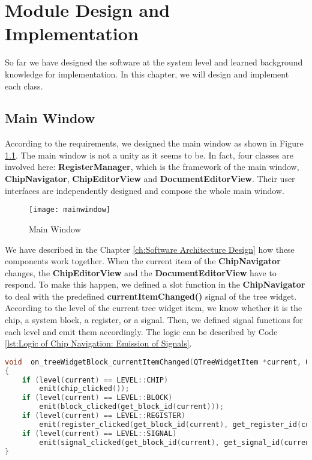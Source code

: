 \chapter{Module Design and Implementation\label{ch:Module Design and Implementation}}
So far we have designed the software at the system level and learned background knowledge for implementation. In this chapter, we will design and implement each class.

\section{Main Window}
According to the requirements, we designed the main window as shown in Figure \ref{fig:Main Window}. The main window is not a unity as it seems to be. In fact, four classes are involved here: \textbf{RegisterManager}, which is the framework of the main window, \textbf{ChipNavigator}, \textbf{ChipEditorView} and \textbf{DocumentEditorView}. Their user interfaces are independently designed and compose the whole main window.

\begin{figure}[htb]
\centering
\texttt{[image: mainwindow]}
\caption{Main Window\label{fig:Main Window}}
\end{figure}

We have described in the Chapter \ref{ch:Software Architecture Design} how these components work together. When the current item of the \textbf{ChipNavigator} changes, the \textbf{ChipEditorView} and the \textbf{DocumentEditorView} have to respond. To make this happen, we defined a slot function in the \textbf{ChipNavigator} to deal with the predefined \textbf{currentItemChanged()} signal of the tree widget. According to the level of the current tree widget item, we know whether it is the chip, a system block, a register, or a signal. Then, we defined signal functions for each level and emit them accordingly. The logic can be described by Code \ref{lst:Logic of Chip Navigation: Emission of Signals}.

\begin{minipage}{\linewidth}
\begin{lstlisting}[language=C++, caption={Logic of Chip Navigation: Emission of Signals\label{lst:Logic of Chip Navigation: Emission of Signals}}]
void  on_treeWidgetBlock_currentItemChanged(QTreeWidgetItem *current, QTreeWidgetItem *previous)
{
    if (level(current) == LEVEL::CHIP) 
        emit(chip_clicked());
    if (level(current) == LEVEL::BLOCK) 
        emit(block_clicked(get_block_id(current)));
    if (level(current) == LEVEL::REGISTER) 
        emit(register_clicked(get_block_id(current), get_register_id(current)));
    if (level(current) == LEVEL::SIGNAL) 
        emit(signal_clicked(get_block_id(current), get_signal_id(current)));
}
\end{lstlisting}
\end{minipage}

